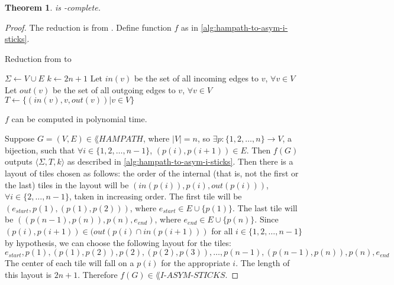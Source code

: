 \documentclass[draft]{article}
\newtheorem{theorem}{Theorem}[section]
\theoremstyle{definition} \newtheorem{definition}[definition]{Definition}
\newcommand{\dash}{\mbox{-}}
\newcommand{\triple}[3]{\langle#1,#2,#3\rangle} %
\newcommand{\aisticks}{I\dash ASYM\dash STICKS}
\begin{document}
  \begin{theorem}\label{thm:asym-i-sticks-npc}
    \lang{\aisticks} is \NP-complete.
  \end{theorem}
  \begin{proof}
    The reduction is from . Define function $f$ as in
    \autoref{alg:hampath-to-asym-i-sticks}.
    \begin{algorithm}\label{alg:hampath-to-asym-i-sticks}
      \caption{Reduction from  to \lang{\aisticks}}
      $\Sigma\gets V\cup E$\;
      $k\gets 2n+1$\;
      Let $in(v)$ be the set of all incoming edges to $v$, $\forall v\in V$\;
      Let $out(v)$ be the set of all outgoing edges to $v$, $\forall v\in V$\;
      $T\gets\{(in(v), v, out(v))|v\in V\}$\;
      \Return{$\triple{\Sigma}{T}{k}$}
    \end{algorithm}
    $f$ can be computed in polynomial time.

    Suppose $G=(V,E)\in\lang{HAMPATH}$, where $|V| = n$, so $\exists
    p\colon\{1,2,\ldots,n\}\to V$, a bijection, such that $\forall
    i\in\{1,2,\ldots,n-1\}$, $(p(i), p(i+1))\in E$. Then $f(G)$ outputs
    $\triple{\Sigma}{T}{k}$ as described in
    \autoref{alg:hampath-to-asym-i-sticks}. Then there is a layout of tiles
    chosen as follows: the order of the internal (that is, not the first or the
    last) tiles in the layout will be $(in(p(i)), p(i), out(p(i)))$, $\forall
    i\in\{2,\ldots, n-1\}$, taken in increasing order. The first tile will be
    $(e_{start}, p(1), (p(1),p(2)))$, where $e_{start}\in E\cup\{p(1)\}$. The
    last tile will be $((p(n-1), p(n)), p(n), e_{end})$, where $e_{end}\in
    E\cup\{p(n)\}$. Since $(p(i),p(i+1))\in(out(p(i)\cap in(p(i+1)))$ for all
    $i\in\{1,2,\ldots,n-1\}$ by hypothesis, we can choose the following layout
    for the tiles:
    \begin{displaymath}
      e_{start}, p(1), (p(1), p(2)), p(2), (p(2), p(3)), \ldots, p(n-1),
      (p(n-1), p(n)), p(n), e_{end}
    \end{displaymath}
    The center of each tile will fall on a $p(i)$ for the appropriate $i$. The
    length of this layout is $2n+1$. Therefore $f(G)\in\lang{\aisticks}$.


\end{proof}
\end{document}
